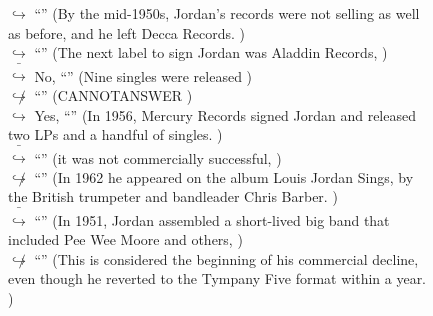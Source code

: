 \documentclass[11pt,a4paper, onecolumn]{article}
\begin{document}
\begin{figure}[t] \small \begin{tcolorbox}[boxsep=0pt,left=5pt,right=0pt,top=2pt,colback = yellow!5] \begin{dialogue}
 \small 
\colorbox{pink!25}{$\hookrightarrow$}
{ ``'' (By the mid-1950s, Jordan's records were not selling as well as before, and he left Decca Records. ) }
\\
\colorbox{pink!25}{$\hookrightarrow$}
{ ``'' (The next label to sign Jordan was Aladdin Records, ) }
\\
\colorbox{pink!25}{ $\bar{\hookrightarrow}$}
\colorbox{red!25}{No,}
{ ``'' (Nine singles were released ) }
\\
\colorbox{pink!25}{$\not\hookrightarrow$}
{ ``'' (CANNOTANSWER ) }
\\
\colorbox{pink!25}{$\hookrightarrow$}
\colorbox{red!25}{Yes,}
{ ``'' (In 1956, Mercury Records signed Jordan and released two LPs and a handful of singles. ) }
\\
\colorbox{pink!25}{ $\bar{\hookrightarrow}$}
{ ``'' (it was not commercially successful, ) }
\\
\colorbox{pink!25}{$\not\hookrightarrow$}
{ ``'' (In 1962 he appeared on the album Louis Jordan Sings, by the British trumpeter and bandleader Chris Barber. ) }
\\
\colorbox{pink!25}{ $\bar{\hookrightarrow}$}
{ ``'' (In 1951, Jordan assembled a short-lived big band that included Pee Wee Moore and others, ) }
\\
\colorbox{pink!25}{$\not\hookrightarrow$}
{ ``'' (This is considered the beginning of his commercial decline, even though he reverted to the Tympany Five format within a year. ) }
\\
 \end{dialogue}\end{tcolorbox}\end{figure}
\end{document}
